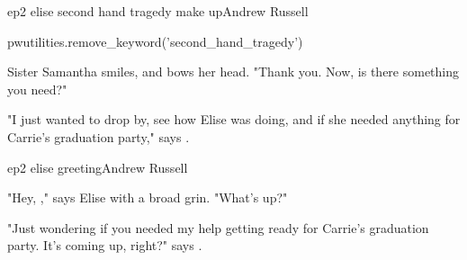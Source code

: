 \documentclass{book}
\begin{document}
\begin{childnode}{ep2 elise second hand tragedy make up}{Andrew Russell}

    \begin{code}

        pwutilities.remove\_keyword('second\_hand\_tragedy')

    \end{code}

    Sister Samantha smiles, and bows her head. "Thank you. Now, is there something you need?"

    "I just wanted to drop by, see how Elise was doing, and if she needed anything for Carrie's graduation party," says \name{}.


\end{childnode}

\begin{childnode}{ep2 elise greeting}{Andrew Russell}

    "Hey, \nickname{}," says Elise with a broad grin. "What's up?"

    "Just wondering if you needed my help getting ready for Carrie's graduation party. It's coming up, right?" says \name{}.


\end{childnode}
\end{document}
